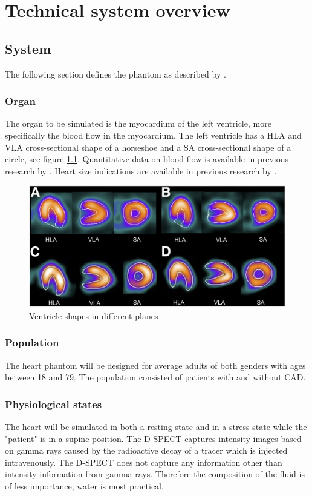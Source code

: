 \chapter{Technical system overview}
\section{System}
The following section defines the phantom as described by \cite{van2011modeling}.
\subsection{Organ}
The organ to be simulated is the myocardium of the left ventricle, more specifically the blood flow in the myocardium. The left ventricle has a \ac{HLA} and \ac{VLA} cross-sectional shape of a horseshoe and a \ac{SA} cross-sectional shape of a circle, see figure \ref{fig:ventricle_shapes}. Quantitative data on blood flow is available in previous research by \cite{uren1994relation, chiribiri2013normal, ho2014dynamic, slart2015Pres}. Heart size indications are available in previous research by \cite{lin2008cardiac, maceira2006normalizedleft, maceira2006normalizedright}.

\begin{figure}[H]
	\includegraphics[scale=1]{./images/ventricle_shapes.jpg}
	\caption{Ventricle shapes in different planes\citep{yoneyama2017validation}}
	\label{fig:ventricle_shapes}
\end{figure}

\subsection{Population}
The heart phantom will be designed for average adults of both genders with ages between 18 and 79. The population consisted of patients with and without \ac{CAD}.
\subsection{Physiological states}
The heart will be simulated in both a resting state and in a stress state while the "patient" is in a supine position. The D-SPECT captures intensity images based on gamma rays caused by the radioactive decay of a tracer which is injected intravenously. The D-SPECT does not capture any information other than intensity information from gamma rays. Therefore the composition of the fluid is of less importance; water is most practical.
